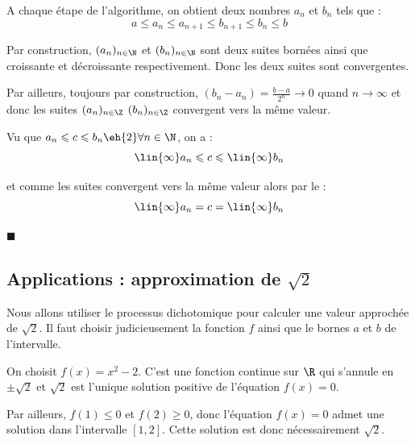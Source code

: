 \smallskip


\begin{demonstration}

A chaque étape de l'algorithme, on obtient deux nombres $a_n$ et $b_n$ tels que :
$$a\leqslant a_{n} \leqslant a_{n+1} \leqslant b_{n+1}\leqslant  b_n \leqslant b$$



Par construction, $(a_n)_{n\in \N}$ et $(b_n)_{n\in \N}$ sont deux suites bornées ainsi que croissante et décroissante respectivement. Donc les deux suites sont convergentes.

\medskip
Par ailleurs, toujours par construction, $(b_n-a_n)=\frac{b-a}{2^n} \to 0$ quand $n\to \infty$ et donc les suites $(a_n)_{n\in \Z}$  $(b_n)_{n\in \Z}$ convergent vers la même valeur. 

\medskip
Vu que $a_n\leqslant c\leqslant b_n\eh{2} \forall n\in\N$, on a :
$$\lin{\infty} a_n\leqslant c\leqslant \lin{\infty} b_n$$

\medskip
et comme les suites convergent vers la même valeur alors par le   :
$$\lin{\infty} a_n=c=\lin{\infty} b_n$$

\vspace{-3mm}
\hfill $\blacksquare$
\end{demonstration}




\subsection{Applications : approximation de  $\sqrt{2}$}

Nous allons utiliser le processus dichotomique pour calculer une valeur approchée de $\sqrt{2}$. Il faut choisir judicieusement la fonction $f$ ainsi que le bornes $a$ et $b$ de l'intervalle.

\medskip
On choisit $f(x)=x^2-2$. C'est une fonction continue sur $\R$ qui s'annule en $\pm\sqrt{2}$ et $\sqrt{2}$ est l'unique solution positive de l'équation $f(x)=0$.

\medskip
Par ailleurs, $f(1) \leqslant 0$ et $f(2) \geqslant 0$, donc l'équation $f(x)=0$ admet une solution dans l'intervalle $[1,2]$. Cette solution est donc nécessairement $\sqrt{2}$.






